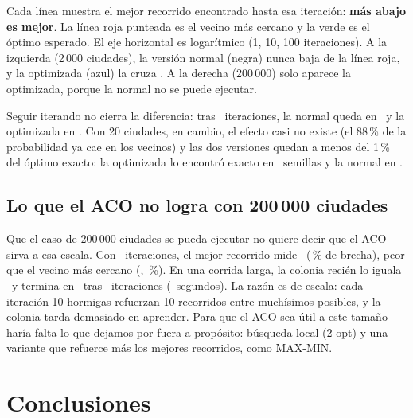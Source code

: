 \documentclass[11pt,a4paper]{article}
\begin{document}
\begin{leer}
Cada línea muestra el mejor recorrido encontrado hasta esa iteración: \textbf{más abajo
es mejor}. La línea roja punteada es el vecino más cercano y la verde es el óptimo
esperado. El eje horizontal es logarítmico (1, 10, 100 iteraciones). A la izquierda
(2\,000 ciudades), la versión normal (negra) nunca baja de la línea roja, y la
optimizada (azul) la cruza \ConvCruceNNOptDosMil. A la derecha (200\,000) solo aparece la
optimizada, porque la normal no se puede ejecutar.
\end{leer}

Seguir iterando no cierra la diferencia: tras \ConvItersNormalDosMil\ iteraciones, la
normal queda en \ConvFinalNormalDosMil\ y la optimizada en \ConvFinalOptDosMil. Con 20
ciudades, en cambio, el efecto casi no existe (el 88\,\% de la probabilidad ya cae en
los vecinos) y las dos versiones quedan a menos del 1\,\% del óptimo exacto: la
optimizada lo encontró exacto en \ExitosOptVeinte\ semillas y la normal en
\ExitosNormalVeinte.

\subsection{Lo que el ACO no logra con 200\,000 ciudades}

Que el caso de 200\,000 ciudades se pueda ejecutar no quiere decir que el ACO sirva a
esa escala. Con \IterDoscientosMil\ iteraciones, el mejor recorrido mide
\BestOptDoscientosMil\ (\BrechaOptDoscientosMil\,\% de brecha), peor que el vecino más
cercano (\LnnDoscientosMil, \BrechaNnDoscientosMil\,\%). En una corrida larga, la colonia
recién lo iguala \ConvCruceNNOptDoscientosMil\ y termina en \ConvFinalOptDoscientosMil\ tras
\ConvItersOptDoscientosMil\ iteraciones (\ConvTiempoOptDoscientosMil\ segundos). La razón es de
escala: cada iteración 10 hormigas refuerzan 10 recorridos entre muchísimos posibles, y
la colonia tarda demasiado en aprender. Para que el ACO sea útil a este tamaño haría
falta lo que dejamos por fuera a propósito: búsqueda local (2-opt) y una variante que
refuerce más los mejores recorridos, como MAX-MIN.

\section{Conclusiones}
\end{document}
